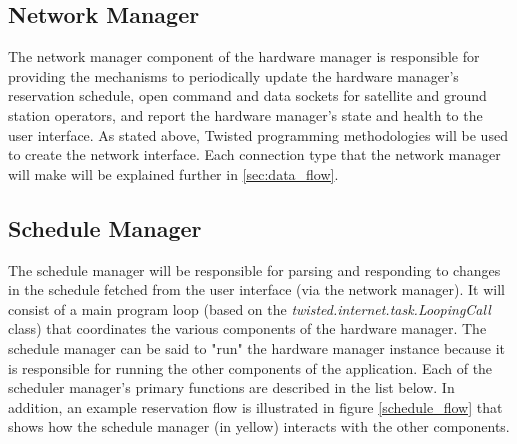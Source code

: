 \documentclass{mxl-design}
\begin{document}
\subsection{Network Manager}
\label{sec:network_manager}
The network manager component of the hardware manager is responsible for providing the mechanisms to periodically update the hardware manager's reservation schedule, open command and data sockets for satellite and ground station operators, and report the hardware manager's state and health to the user interface. As stated above, Twisted programming methodologies will be used to create the network interface.  Each connection type that the network manager will make will be explained further in \ref{sec:data_flow}.

\subsection{Schedule Manager}
\label{sec:schedule_manager}
The schedule manager will be responsible for parsing and responding to changes in the schedule fetched from the user interface (via the network manager). It will consist of a main program loop (based on the \textit{twisted.internet.task.LoopingCall} class) that coordinates the various components of the hardware manager. The schedule manager can be said to "run" the hardware manager instance because it is responsible for running the other components of the application. Each of the scheduler manager's primary functions are described in the list below. In addition, an example reservation flow is illustrated in figure \ref{schedule_flow} that shows how the schedule manager (in yellow) interacts with the other components.
\end{document}
